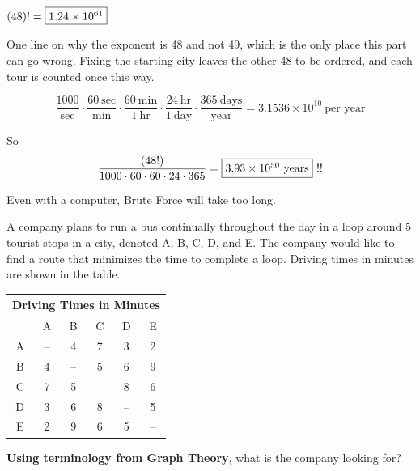 \begin{sol}
$(48)! = \fbox{$1.24 \times 10^{61}$}$

\begin{add}{One line on why the exponent is 48 and not 49, which is the only place this part can go wrong.}
Fixing the starting city leaves the other 48 to be ordered, and each tour is counted once this way.
\end{add}
\end{sol}

\begin{sol}
$$\frac{1000}{\text{sec}} \cdot \frac{60\ \text{sec}}{\text{min}} \cdot
\frac{60\ \text{min}}{1\ \text{hr}} \cdot \frac{24\ \text{hr}}{1\ \text{day}} \cdot
\frac{365\ \text{days}}{\text{year}} = 3.1536 \times 10^{10} \ \text{per year}$$

So
$$\frac{(48!)}{1000 \cdot 60 \cdot 60 \cdot 24 \cdot 365}
= \fbox{$3.93 \times 10^{50}$ years} \ !!$$
\end{sol}

\begin{sol}
Even with a computer, Brute Force will take too long.
\end{sol}


\begin{stmt}
A company plans to run a bus continually throughout the day in a loop around 5 tourist stops in a
city, denoted A, B, C, D, and E. The company would like to find a route that minimizes the time to
complete a loop. Driving times in minutes are shown in the table.

\begin{center}
\begin{tabular}{|c||c|c|c|c|c|}
\multicolumn{6}{c}{Driving Times in Minutes}\\
\hline
& A & B & C & D & E \\
\hline\hline
A & -- & 4 & 7 & 3 & 2 \\
\hline
B & 4 & -- & 5 & 6 & 9 \\
\hline
C & 7 & 5 & -- & 8 & 6 \\
\hline
D & 3 & 6 & 8 & -- & 5 \\
\hline
E & 2 & 9 & 6 & 5 & -- \\
\hline
\end{tabular}
\end{center}

\textbf{Using terminology from Graph Theory}, what is the company looking for?
\end{stmt}

